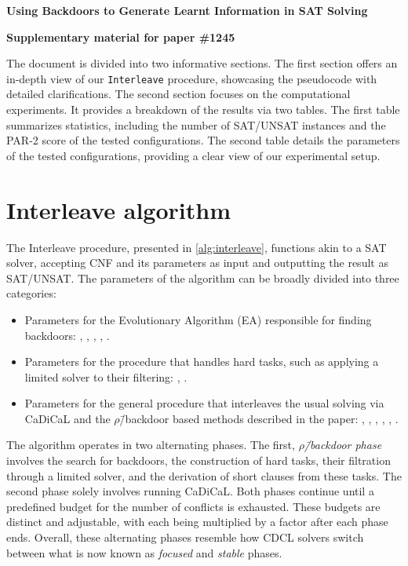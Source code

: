 \documentclass[a4paper]{article}
\begin{document}
\begin{center}
    {\large\bfseries Using Backdoors to Generate Learnt Information in SAT Solving}
\end{center}
\begin{center}
    {\bfseries Supplementary material for paper \#1245}
\end{center}

The document is divided into two informative sections.
The first section offers an in-depth view of our \texttt{Interleave} procedure, showcasing the pseudocode with detailed clarifications.
The second section focuses on the computational experiments.
It provides a breakdown of the results via two tables.
The first table summarizes statistics, including the number of SAT/UNSAT instances and the PAR-2 score of the tested configurations.
The second table details the parameters of the tested configurations, providing a clear view of our experimental setup.



\section{Interleave algorithm}

The Interleave procedure, presented in \cref{alg:interleave}, functions akin to a SAT solver, accepting CNF and its parameters as input and outputting the result as SAT/UNSAT.
The parameters of the algorithm can be broadly divided into three categories:
\begin{itemize}
    \item Parameters for the Evolutionary Algorithm (EA) responsible for finding backdoors: \backdoorSize, \banUsed, \seed, \numIters, \stagnationlimit.

    \item Parameters for the procedure that handles hard tasks, such as applying a limited solver to their filtering: \maxProduct, \numConflicts.

    \item Parameters for the general procedure that interleaves the usual solving via CaDiCaL and the $\rho$\=/backdoor based methods described in the paper: \budgetFilter, \budgetSolve, \factorBudgetFilter, \factorBudgetSolve, \deriveTernary, \budgetPresolve.
\end{itemize}

The algorithm operates in two alternating phases.
The first, \emph{$\rho$\=/backdoor phase} involves the search for backdoors, the construction of hard tasks, their filtration through a limited solver, and the derivation of short clauses from these tasks.
The second phase solely involves running CaDiCaL.
Both phases continue until a predefined budget for the number of conflicts is exhausted.
These budgets are distinct and adjustable, with each being multiplied by a factor after each phase ends.
Overall, these alternating phases resemble how CDCL solvers switch between what is now known as \emph{focused} and \emph{stable} phases.
\end{document}
